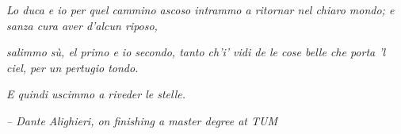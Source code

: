 \clearpage
\thispagestyle{empty}
\vspace*{\fill}

\begin{flushright}

    {\parindent=0pt \obeylines
        \itshape
        Lo duca e io per quel cammino ascoso
        intrammo a ritornar nel chiaro mondo;
        e sanza cura aver d’alcun riposo,
    }
    \vspace{4mm}

    {\parindent=0pt \obeylines
        \itshape
        salimmo sù, el primo e io secondo,
        tanto ch’i’ vidi de le cose belle
        che porta ’l ciel, per un pertugio tondo.
    }
    \vspace{4mm}

    {\parindent=0pt \obeylines
        \itshape
        E quindi uscimmo a riveder le stelle. 
    }
    \vspace{6mm}

    {\parindent=0pt \obeylines
        \itshape
        \--- Dante Alighieri,
        on finishing a master degree at TUM
    }
\end{flushright}
